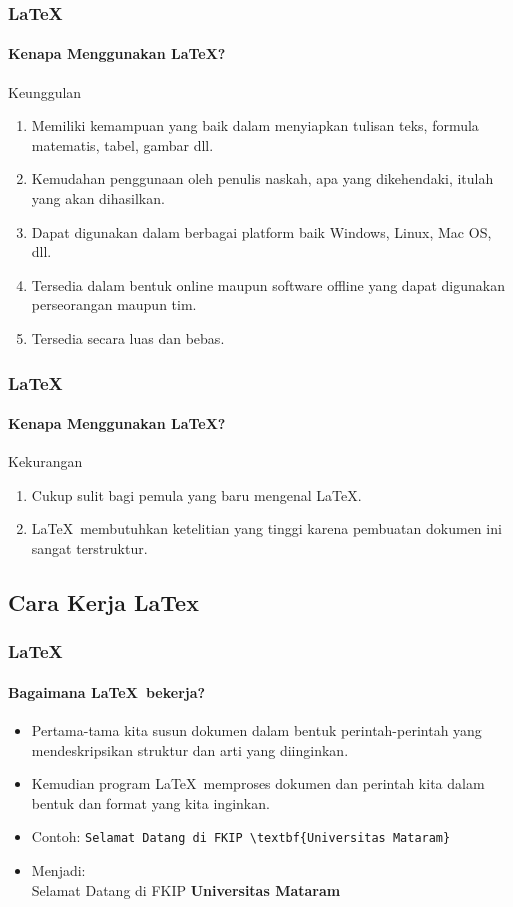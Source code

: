 \documentclass[aspectratio=169]{beamer}
\begin{document}
\begin{frame}
\frametitle{\LaTeX}
\framesubtitle{Kenapa Menggunakan \LaTeX?}

\begin{exampleblock}{Keunggulan}
\begin{enumerate}
    \item Memiliki kemampuan yang baik dalam menyiapkan tulisan teks, formula matematis, tabel, gambar dll.
    \item Kemudahan penggunaan oleh penulis naskah, apa yang dikehendaki, itulah yang akan dihasilkan.
    \item Dapat digunakan dalam berbagai platform baik Windows, Linux, Mac OS, dll.
    \item Tersedia dalam bentuk online maupun software offline yang dapat digunakan perseorangan maupun tim.
    \item Tersedia secara luas dan bebas.
\end{enumerate}
\end{exampleblock}
\end{frame}

\begin{frame}
\frametitle{\LaTeX}
\framesubtitle{Kenapa Menggunakan \LaTeX?}

\begin{alertblock}{Kekurangan}
\begin{enumerate}
    \item Cukup sulit bagi pemula yang baru mengenal \LaTeX.
    \item \LaTeX\ membutuhkan ketelitian yang tinggi karena pembuatan dokumen ini sangat terstruktur.
\end{enumerate}
\end{alertblock}
\end{frame}

\subsection{Cara Kerja LaTex}
\begin{frame}[fragile]
\frametitle{\LaTeX}
\framesubtitle{Bagaimana \LaTeX\ bekerja?}
\begin{itemize}
    \item Pertama-tama kita susun dokumen dalam bentuk perintah-perintah yang mendeskripsikan struktur dan arti yang diinginkan.
    \item Kemudian program \LaTeX\ memproses dokumen dan perintah kita dalam bentuk dan format yang kita inginkan.
    \item Contoh:
    \verb|Selamat Datang di FKIP \textbf{Universitas Mataram}|
    \item Menjadi: \\
    Selamat Datang di FKIP \textbf{Universitas Mataram}
\end{itemize}
\end{frame}
\end{document}
